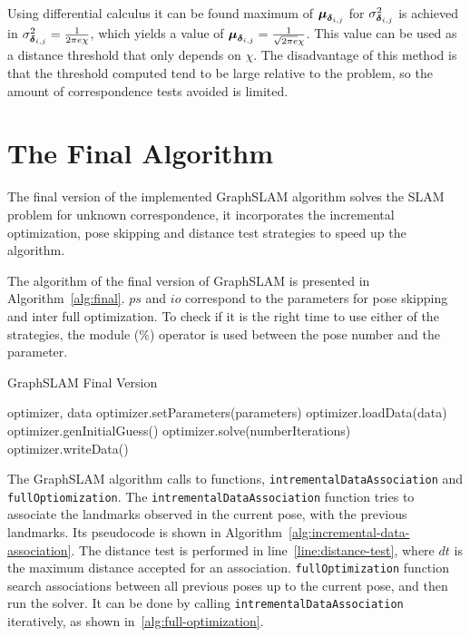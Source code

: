Using differential calculus it can be found maximum of $\boldsymbol{\mu}_{\boldsymbol{\delta}_{i,j}}$ for $\sigma_{\boldsymbol{\delta}_{i,j}}^2$ is achieved in $\sigma_{\boldsymbol{\delta}_{i,j}}^2 = \frac{1}{2\pi e\chi}$, which yields a value of $\boldsymbol{\mu}_{\boldsymbol{\delta}_{i,j}} = \frac{1}{\sqrt{2\pi e}\chi}$.  
This value can be used as a  distance threshold that only depends on $\chi$. The disadvantage of this method is that the threshold computed tend to be large relative to the problem, so the amount of correspondence tests avoided is limited.

\section{The Final Algorithm}

The final version of the implemented GraphSLAM algorithm solves the SLAM problem for unknown correspondence, it incorporates the incremental optimization, pose skipping and  distance test strategies to speed up the algorithm.

The algorithm of the final version of GraphSLAM is presented in Algorithm~\ref{alg:final}. $ps$ and $io$ correspond to the parameters for pose skipping and inter full optimization. To check if it is the right time to use either of the strategies, the module ($\%$) operator is used between the pose number and the parameter. 

\begin{algorithm}[htbp!]
    \caption{GraphSLAM Final Version}
    \label{alg:final}
    \begin{algorithmic}[1]
        \Require optimizer, data
        \State optimizer.setParameters(parameters)
        \State optimizer.loadData(data)
        \State optimizer.genInitialGuess()
        \State
        \State {}
        \State optimizer.solve(numberIterations)
        \EndIf
        \State {}
        \EndIf
        \EndFor
        \State
        \State optimizer.writeData()
    \end{algorithmic}
\end{algorithm}

The GraphSLAM algorithm calls to functions, \texttt{intremental\-Data\-Association} and \texttt{full\-Optiomization}. The \texttt{intrementalDataAssociation} function tries to associate the landmarks observed in the current pose, with the previous landmarks. Its pseudocode is shown in Algorithm~\ref{alg:incremental-data-association}. The distance test is performed in line~\ref{line:distance-test}, where $dt$ is the maximum distance accepted for an association. \texttt{full\-Optimization} function search associations between all previous poses up to the current pose, and then run the solver. It can be done by calling \texttt{intremental\-Data\-Association} iteratively, as shown in~\ref{alg:full-optimization}.

